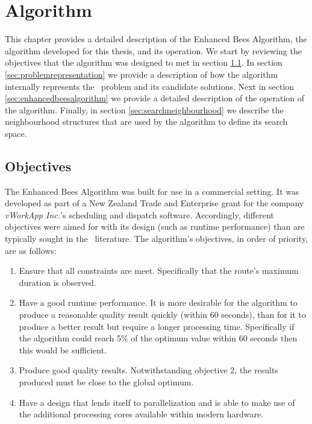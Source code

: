 
\chapter{Algorithm}
\label{chap:algorithm}

This chapter provides a detailed description of the Enhanced Bees Algorithm, the algorithm developed for this thesis, and its operation. We start by reviewing the objectives that the algorithm was designed to met in section \ref{sec:objectives}. In section \ref{sec:problemrepresentation} we provide a description of how the algorithm internally represents the \VRP\ problem and its candidate solutions. Next in section \ref{sec:enhancedbeesalgorithm} we provide a detailed description of the operation of the algorithm. Finally, in section \ref{sec:searchneighbourhood} we describe the neighbourhood structures that are used by the algorithm to define its search space.

\section{Objectives}
\label{sec:objectives}

The Enhanced Bees Algorithm was built for use in a commercial setting. It was developed as part of a New Zealand Trade and Enterprise grant for the company \emph{vWorkApp Inc.}'s scheduling and dispatch software. Accordingly, different objectives were aimed for with its design (such as runtime performance) than are typically sought in the \VRP\ literature. The algorithm's objectives, in order of priority, are as follows:

\begin{enumerate}
   \item Ensure that all constraints are meet. Specifically that the route's maximum duration is observed. 
   
   \item Have a good runtime performance. It is more desirable for the algorithm to produce a reasonable quality result quickly (within 60 seconds), than for it to produce a better result but require a longer processing time. Specifically if the algorithm could reach 5\% of the optimum value within 60 seconds then this would be sufficient. 

   \item Produce good quality results. Notwithstanding objective 2, the results produced must be close to the global optimum. 
   
   \item Have a design that lends itself to parallelization and is able to make use of the additional processing cores available within modern hardware.
   
\end{enumerate}

